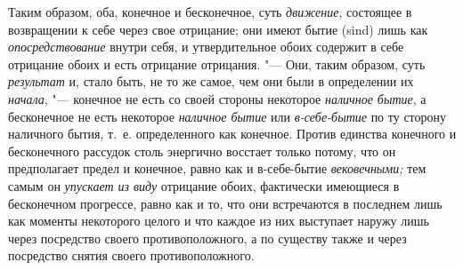 Таким образом, оба, конечное и бесконечное, суть
{\em движение}, состоящее в возвращении к себе через
свое отрицание; они имеют бытие (sind) лишь как
{\em опосредствование} внутри себя, и утвердительное
обоих содержит в себе отрицание обоих и есть отрицание отрицания. "--- Они,
таким образом, суть {\em результат} и, стало быть, не
то же самое, чем они были в определении их
{\em начала}, "--- конечное не есть со своей стороны
некоторое {\em наличное бытие}, а бесконечное не есть
некоторое {\em наличное бытие} или
{\em в-себе-бытие} по ту сторону наличного бытия, т.~е.
определенного как конечное. Против единства конечного и бесконечного
рассудок столь энергично восстает только потому, что он предполагает предел
и конечное, равно как и в-себе-бытие {\em вековечными;}
тем самым он {\em упускает из виду} отрицание обоих,
фактически имеющиеся в бесконечном прогрессе, равно как и то, что они
встречаются в последнем лишь как моменты некоторого целого и что каждое из
них выступает наружу лишь через посредство своего противоположного, а по
существу также и через посредство снятия своего противоположного.

